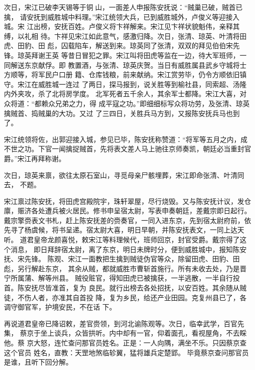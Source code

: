 次日，宋江已破李天锡等于铜山，一面差人申报陈安抚说：“贼巢已破，贼首已
擒，
请安抚到威胜城中料理。”宋江统领大兵，已到威胜城外，卢俊义等迎接入城。宋
江出榜，安抚百姓。卢俊义将卞祥解来。宋江见卞祥状貌魁伟，亲释其缚，以礼相
待。卞祥见宋江如此意气，感激归降。次日，张清、琼英、叶清将田虎、田豹、田
彪，囚载陷车，解送到来。琼英同了张清，双双的拜见伯伯宋先锋。琼英拜谢王英
等昔日冒犯之罪。宋江叫将田虎等监在一边，待大军班师，一同解送东京献俘。即
教置酒，与张清、琼英庆贺。当日有威胜属县武乡守城将士方顺等，将军民户口册
籍、仓库钱粮，前来献纳。宋江赏劳毕，仍令方顺依旧镇守。宋江在威胜城一连过
了两日，探马报到，说关胜等到榆社县，同索超、汤隆内外夹攻，杀了北将房学度。
北军死者五千余人，其余军士都降。宋江大喜，对众将道：“都赖众兄弟之力，得
成平寇之功。”即细细标写众将功劳，及张清、琼英擒贼首、捣贼巢的大功。又过
了三四日，关胜兵马方到，又报陈安抚兵马也到了。

宋江统领将佐，出郭迎接入城，参见已毕，陈安抚称赞道：“将军等五月之内，成
不世之功。下官一闻擒捉贼首，先将表文差人马上驰往京师奏凯，朝廷必当重封官
爵。”宋江再拜称谢。

次日，琼英来禀，欲往太原石室山，寻觅母亲尸骸埋葬，宋江即命张清、叶清同去，
不题。

宋江禀过陈安抚，将田虎宫殿院宇，珠轩翠屋，尽行烧毁。又与陈安抚计议，发仓
廪，赈济各处遭兵被火居民。修书申呈宿太尉，写表申奏朝廷，差戴宗即日起行。
戴宗擎赍表文书札，赶上陈安抚差的赍奏官，一同入进东京，先到宿太尉府前，依
先寻了杨虞候，将书呈递。宿太尉大喜，明日早朝，并陈安抚表文，一同上达天听。
道君皇帝龙颜喜悦，敕宋江等料理候代，班师回京，封官受爵。戴宗得了这个消息，
即日拜辞宿太尉，离了东京，明日未牌时分，便到威胜城中，报知陈安抚、宋先锋。
陈观、宋江一面教把生擒到贼徒伪官等众，除留田虎、田豹、田彪，另行解赴东京，
其余从贼，都就威胜市曹斩首施行。所有未收去处，乃是晋宁所属蒲、解等州县。
贼役赃官，得知田虎已被擒获，一半逃散，一半自行投首。陈安抚尽皆准首，复为
良民。就行出榜去各处招抚，以安百姓。其余随从贼徒，不伤人者，亦准其自首投
降，复为乡民，给还产业田园。克复州县已了，各调守御官军，护境安民，不在话
下。

再说道君皇帝已降诏敕，差官赍领，到河北谕陈观等。次日，临幸武学，百官先集，
蔡京于坐上谈兵，众皆拱听。内中却有一官，仰着面孔，看视屋角，不去睬他。蔡
京大怒，连忙查问那官员姓名。正是：一人向隅，满坐不乐。只因蔡京查这个官员
姓名，直教：天罡地煞临轸翼，猛将雄兵定楚郢。
毕竟蔡京查问那官员是谁，且听下回分解。